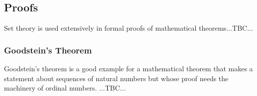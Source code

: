 \subsection{Proofs}
Set theory is used extensively in formal proofs of mathematical theorems...TBC...

\subsubsection{Goodstein's Theorem}
Goodstein's theorem is a good example for a mathematical theorem that makes a statement about sequences of natural numbers but whose proof needs the machinery of ordinal numbers. ...TBC...


\begin{comment}

ToDo:
-Infinite Sets 
 -Construction of natural, integer, rational and real numbers
 -Cardinal Numbers
 -Ordinal Numbers (as generalization of cardinal numbers)
 -Surreal Numbers
 -Cantor-Bernstein Theorem
 -Continuum Hypothesis
 -Notation: looks like in axiomatic set theory, it's more common to use lowercase letters like x,y for sets (rather than A,B, ...). That looks better in predicate logic formulas
 -maybe use \varphi for predicates



Set Containment:
-If for all x in A, x in B, then A \subseteq B

Lebesgue-Measure:
 https://www.youtube.com/watch?v=0VD3BWDLmU0

...set theory sometimes appears like a "write-only-language




Das Zermelo-Fraenkel-Axiomensystem der Mengenlehre (ZF)
https://www.youtube.com/watch?v=U10UYyXv5gM&list=PLb0zKSynM2PAuxxtMK1bxYPV_bUoPtpTB&index=1&t=0s

Bourbaki:
-Collective of authors writing a series of books in the early 1900s that aimed to build up all of math axiomatically. The first volume was about set theory

Was sind Kardinalzahlen? Was besagt die Kontinuumshypothese?
https://www.youtube.com/watch?v=qijXa3U4Nag&list=PLb0zKSynM2PCrgebQsfrzEsUIuA0I_wdG&index=1&t=0s


For the ZFC axioms, see:

https://en.wikipedia.org/wiki/Zermelo%
1. Axiom of extensionality
2. Axiom of regularity (also called the axiom of foundation)
3. Axiom schema of specification (or of separation, or of restricted comprehension)
4. Axiom of pairing
5. Axiom of union
6. Axiom schema of replacement
7. Axiom of infinity
8. Axiom of power set
9. Axiom of choice


\end{comment}
